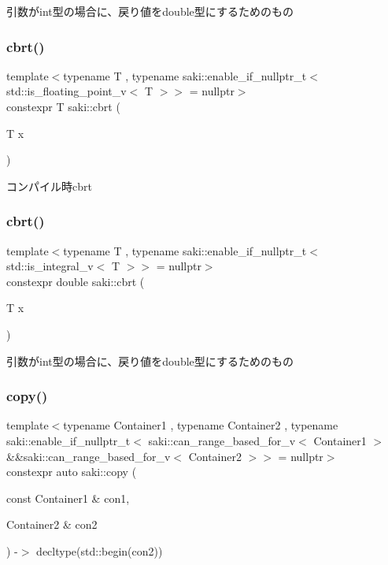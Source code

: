 引数がint型の場合に、戻り値をdouble型にするためのもの 

\mbox{\label{namespacesaki_a8836c929b71a61cf0151d3b76eb7af15}} 
\subsubsection{\texorpdfstring{cbrt()}{cbrt()}\hspace{0.1cm}{\footnotesize\ttfamily [1/2]}}
{\footnotesize\ttfamily template$<$typename T , typename saki\+::enable\+\_\+if\+\_\+nullptr\+\_\+t$<$ std\+::is\+\_\+floating\+\_\+point\+\_\+v$<$ T $>$$>$  = nullptr$>$ \\
constexpr T saki\+::cbrt (\begin{DoxyParamCaption}\item[{T}]{x }\end{DoxyParamCaption})}



コンパイル時cbrt 

\mbox{\label{namespacesaki_a5a3d1ab0508dcff1fb2e17a4ef8a855d}} 
\subsubsection{\texorpdfstring{cbrt()}{cbrt()}\hspace{0.1cm}{\footnotesize\ttfamily [2/2]}}
{\footnotesize\ttfamily template$<$typename T , typename saki\+::enable\+\_\+if\+\_\+nullptr\+\_\+t$<$ std\+::is\+\_\+integral\+\_\+v$<$ T $>$$>$  = nullptr$>$ \\
constexpr double saki\+::cbrt (\begin{DoxyParamCaption}\item[{T}]{x }\end{DoxyParamCaption})}



引数がint型の場合に、戻り値をdouble型にするためのもの 

\mbox{\label{namespacesaki_a3a9c67bf73207dfb61db4cd53ee35863}} 
\subsubsection{\texorpdfstring{copy()}{copy()}}
{\footnotesize\ttfamily template$<$typename Container1 , typename Container2 , typename saki\+::enable\+\_\+if\+\_\+nullptr\+\_\+t$<$ saki\+::can\+\_\+range\+\_\+based\+\_\+for\+\_\+v$<$ Container1 $>$ \&\&saki\+::can\+\_\+range\+\_\+based\+\_\+for\+\_\+v$<$ Container2 $>$$>$  = nullptr$>$ \\
constexpr auto saki\+::copy (\begin{DoxyParamCaption}\item[{const Container1 \&}]{con1,  }\item[{Container2 \&}]{con2 }\end{DoxyParamCaption}) -\/$>$ decltype(std\+::begin(con2))
	}



